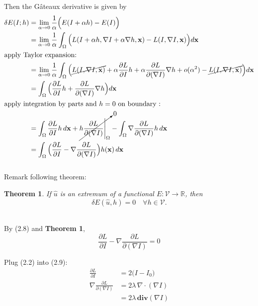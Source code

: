 \documentclass[paper=a4, fontsize=11pt]{scrartcl} %
\numberwithin{equation}{section} %
\numberwithin{figure}{section} %
\numberwithin{table}{section} %
\renewcommand{\vec}[1]{\mathbf{#1}}
\newtheorem{theorem}{Theorem}
\begin{document}
Then the G\^ateaux derivative is given by 
\begin{align}
	\delta E(I;h) &= \lim_{\alpha \to 0} \frac{1}{\alpha}\Big(E(I + \alpha h) - E(I)\Big) \\
	&= \lim_{\alpha \to 0} \frac{1}{\alpha} \int_\Omega \Big(L(I + \alpha h, \nabla I + \alpha \nabla h, \vec{x}) - L(I, \nabla I, \vec{x}) \Big) d\vec{x} \\ 
	\shortintertext{apply Taylor expansion:} 
	&= \lim_{\alpha \to 0} \frac{1}{\alpha} \int_\Omega \Big( \cancel{L(I, \nabla I, \vec{x})} + \alpha \frac{\partial L}{\partial I} h + \alpha \frac{\partial L}{\partial (\nabla I)} \nabla h + o(\alpha^2) - \cancel{L(I, \nabla I, \vec{x})} \Big) d\vec{x} \\
	&= \int_\Omega \Big( \frac{\partial L}{\partial I} h + \frac{\partial L}{\partial (\nabla I)} \nabla h \Big) d\vec{x} \\
	\shortintertext{apply integration by parts and $h = 0$ on boundary :} 
	&= \int_\Omega \frac{\partial L}{\partial I} h \, d\vec{x} + \cancelto{0}{h \frac{\partial L}{\partial (\nabla I)} \Bigg|_\Omega}  - \int_\Omega \nabla \frac{\partial L}{\partial (\nabla I)} h \, d\vec{x} \\
	&= \int_\Omega \Big( \frac{\partial L}{\partial I} - \nabla \frac{\partial L}{\partial (\nabla I)} \Big)h(\vec{x}) \, d\vec{x}
\end{align} \\

Remark following theorem:

\begin{theorem}
	If $\hat{u}$ is an extremum of a functional $E : \mathcal{V} \rightarrow \mathbb{R}$, then \\
	\begin{equation*}
		\delta E(\hat{u}, h) = 0 \quad \forall h \in \mathcal{V}.
	\end{equation*} \\
\end{theorem}

By (2.8) and \textbf{Theorem 1}, 
\begin{equation}
	\frac{\partial L}{\partial I} - \nabla \frac{\partial L}{\partial (\nabla I)} = 0	
\end{equation}


Plug (2.2) into (2.9): 
\begin{align}
	\frac{\partial L}{\partial I} &= 2 \big(I - I_0) \\
	\nabla \frac{\partial L}{\partial (\nabla I)} &= 2 \lambda \, \nabla \cdot (\nabla I) \\ 
	&= 2 \lambda \, \textbf{div}(\nabla I)
\end{align}
 
\end{document}
